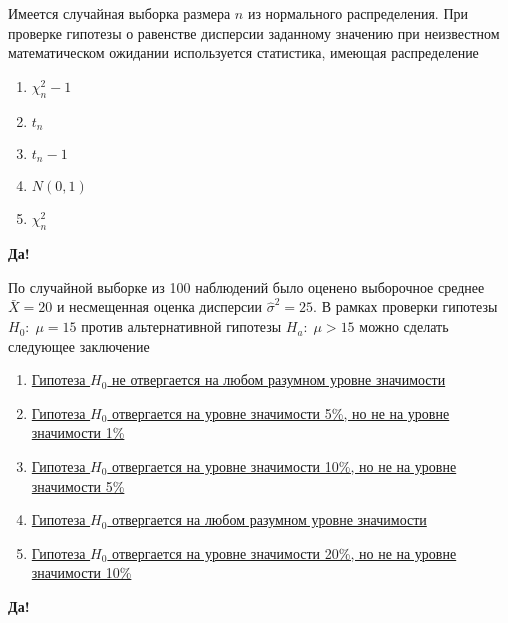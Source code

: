\documentclass[t]{beamer}
\begin{document}
 \begin{frame} \label{42-Yes} 
\begin{block}{42} 

Имеется случайная выборка размера $n$ из нормального распределения. При проверке гипотезы о равенстве дисперсии заданному значению при неизвестном математическом ожидании используется статистика, имеющая распределение
 


 \end{block} 
\begin{enumerate} 
\item[] \hyperlink{42-Yes}{\beamergotobutton{} $\chi^2_n-1$}
\item[] \hyperlink{42-No}{\beamergotobutton{} $t_n$}
\item[] \hyperlink{42-No}{\beamergotobutton{}  $t_n-1$}
\item[] \hyperlink{42-No}{\beamergotobutton{} $N(0,1)$}
\item[] \hyperlink{42-No}{\beamergotobutton{} $\chi^2_n$}
\end{enumerate} 

 \textbf{Да!} 
 \hyperlink{43}{}\end{frame} 


 \begin{frame} \label{43-Yes} 
\begin{block}{43} 

По случайной выборке из 100 наблюдений было оценено выборочное среднее $\bar{X}=20$  и несмещенная оценка дисперсии  $\hat{\sigma}^2=25$. В рамках проверки гипотезы $H_0: \; \mu=15$  против альтернативной гипотезы $H_a: \; \mu>15$  можно сделать следующее заключение
 


 \end{block} 
\begin{enumerate} 
\item[] \hyperlink{43-No}{\beamergotobutton{} Гипотеза $H_0$  не отвергается на любом разумном уровне значимости}
\item[] \hyperlink{43-No}{\beamergotobutton{} Гипотеза $H_0$  отвергается на уровне значимости 5\%, но не  на уровне значимости 1\%}
\item[] \hyperlink{43-No}{\beamergotobutton{} Гипотеза  $H_0$ отвергается на уровне значимости 10\%, но не на уровне значимости 5\%}
\item[] \hyperlink{43-Yes}{\beamergotobutton{} Гипотеза $H_0$  отвергается на любом разумном уровне значимости}
\item[] \hyperlink{43-No}{\beamergotobutton{} Гипотеза  $H_0$ отвергается на уровне значимости 20\%, но не  на уровне значимости 10\%}
\end{enumerate} 

 \textbf{Да!} 
 \hyperlink{44}{}\end{frame} 
\end{document}

